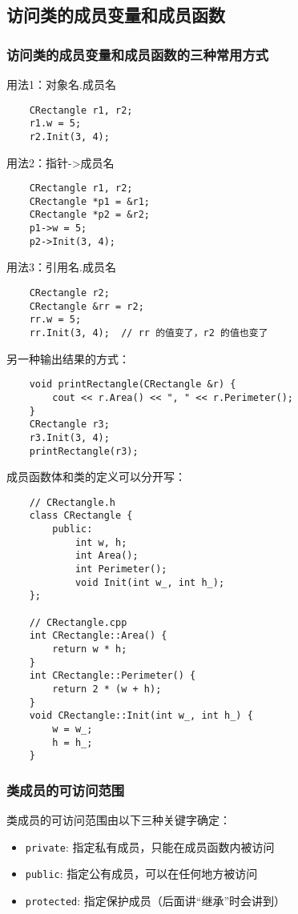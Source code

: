 \documentclass[UTF8]{ctexart}
\begin{document}
\subsection{访问类的成员变量和成员函数}
\subsubsection{访问类的成员变量和成员函数的三种常用方式}
用法1：对象名.成员名
\begin{verbatim}
    CRectangle r1, r2;
    r1.w = 5;
    r2.Init(3, 4);
\end{verbatim}

用法2：指针->成员名
\begin{verbatim}
    CRectangle r1, r2;
    CRectangle *p1 = &r1;
    CRectangle *p2 = &r2;
    p1->w = 5;
    p2->Init(3, 4);
\end{verbatim}

用法3：引用名.成员名
\begin{verbatim}
    CRectangle r2;
    CRectangle &rr = r2;
    rr.w = 5;
    rr.Init(3, 4);  // rr 的值变了，r2 的值也变了
\end{verbatim}

另一种输出结果的方式：
\begin{verbatim}
    void printRectangle(CRectangle &r) {
        cout << r.Area() << ", " << r.Perimeter();
    }
    CRectangle r3;
    r3.Init(3, 4);
    printRectangle(r3);
\end{verbatim}

成员函数体和类的定义可以分开写：
\begin{verbatim}
    // CRectangle.h
    class CRectangle {
        public:
            int w, h;
            int Area();
            int Perimeter();
            void Init(int w_, int h_);
    };

    // CRectangle.cpp
    int CRectangle::Area() {
        return w * h;
    }
    int CRectangle::Perimeter() {
        return 2 * (w + h);
    }
    void CRectangle::Init(int w_, int h_) {
        w = w_;
        h = h_;
    }
\end{verbatim}

\subsubsection{类成员的可访问范围}
类成员的可访问范围由以下三种关键字确定：
\begin{itemize}
    \item \texttt{private}: 指定私有成员，只能在成员函数内被访问
    \item \texttt{public}: 指定公有成员，可以在任何地方被访问
    \item \texttt{protected}: 指定保护成员（后面讲“继承”时会讲到）
\end{itemize}
\end{document}
